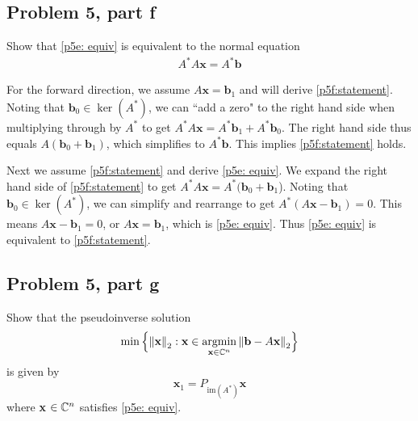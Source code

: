 \newpage
\subsection{Problem 5, part f}
Show that \ref{p5e: equiv} is equivalent to the normal equation
\begin{align}
A^*A\textbf{x} = A^*\textbf{b} \label{p5f:statement} 
\end{align}


\partbreak
\begin{solution}

For the forward direction, we assume $A\textbf{x} = \textbf{b}_1$ and will derive \ref{p5f:statement}. Noting that $\textbf{b}_0 \in \ker(A^*)$, we can ``add a zero"  to the right hand side when multiplying through by $A^*$ to get  $A^*A\textbf{x} = A^*\textbf{b}_1 + A^*\textbf{b}_0$. The right hand side thus equals $A(\textbf{b}_0 + \textbf{b}_1)$, which simplifies to $A^*\textbf{b}$. This implies \ref{p5f:statement} holds. 

\jump
Next we assume \ref{p5f:statement} and derive \ref{p5e: equiv}.  We expand the right hand side of \ref{p5f:statement} to get $A^*A\textbf{x} = A^*(\textbf{b}_0 + \textbf{b}_1$). Noting that $\textbf{b}_0 \in \ker(A^*)$, we can simplify and rearrange to get $A^*(A\textbf{x} - \textbf{b}_1) = 0$. This means $A\textbf{x} - \textbf{b}_1 = 0$, or $A\textbf{x} = \textbf{b}_1$, which is \ref{p5e: equiv}. Thus \ref{p5e: equiv} is equivalent to \ref{p5f:statement}.
\end{solution}

\subsection{Problem 5, part g}
Show that the pseudoinverse solution
\[
\min \Big\{ \norm{\textbf{x}}_2 : \textbf{x} \in \operatorname*{argmin}_{\textbf{x} \in \mathbb{C}^n}\norm{\textbf{b} - A\textbf{x}}_2\Big\}
\]
is given by
\[
\textbf{x}_1 = P_{\text{im}(A^*)}\textbf{x}
\]
where \textbf{x} $\in \mathbb{C}^n$ satisfies \ref{p5e: equiv}.

\partbreak
\begin{solution}

    
\end{solution}

